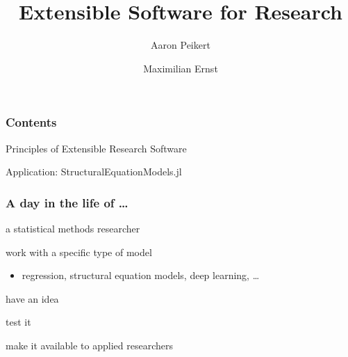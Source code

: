 \documentclass{beamer}
\title{Extensible Software for Research}
\author{Aaron Peikert}
\date{Maximilian Ernst}
\newenvironment{wideitemize}{
    \itemize\addtolength{\itemsep}{15pt}\addtolength{\topsep}{10pt}}{\enditemize}
\begin{document}
	\setcounter{showProgressBar}{0}
	\setcounter{showSlideNumbers}{0}

	\frame{\titlepage}

	\setcounter{framenumber}{0}
	\setcounter{showProgressBar}{1}
	\setcounter{showSlideNumbers}{1}
	
    \begin{frame}
        \frametitle{Contents}
        \vspace{1cm}
        \begin{wideitemize}
            \item Principles of Extensible Research Software
        \end{wideitemize}
        \vspace{1cm}
        \begin{wideitemize}
            \item Application: StructuralEquationModels.jl
        \end{wideitemize}
    \end{frame}


    \begin{frame}
        \frametitle{A day in the life of \ldots}
        a statistical methods researcher\\
        \vspace{0.8cm}
        \begin{wideitemize}
            \item<2-> work with a specific type of model
            \begin{itemize}
            \item<2-> regression, structural equation models, deep learning, \ldots
            \end{itemize}
            \item<3-> have an idea
            \item<4-> test it
            \item<5-> make it available to applied researchers
        \end{wideitemize}
    \end{frame}
\end{document}
